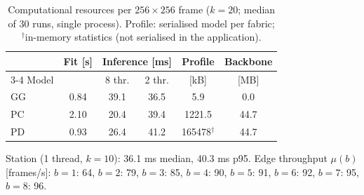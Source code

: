 \begin{table}[t]
\centering
\caption{Computational resources per $256\times256$ frame ($k=20$; median of 30 runs, single process). Profile: serialised model per fabric; $^\dagger$in-memory statistics (not serialised in the application).}
\label{tab:resources}
\footnotesize
\setlength{\tabcolsep}{4pt}
\begin{tabular}{@{}lccccc@{}}
\toprule
& Fit [s] & \multicolumn{2}{c}{Inference [ms]} & Profile & Backbone \\
\cmidrule(lr){3-4}
Model & & 8 thr. & 2 thr. & [kB] & [MB] \\
\midrule
GG & 0.84 & 39.1 & 36.5 & 5.9 & 0.0 \\
PC & 2.10 & 20.4 & 39.4 & 1221.5 & 44.7 \\
PD & 0.93 & 26.4 & 41.2 & 165478$^\dagger$ & 44.7 \\
\bottomrule
\end{tabular}

\vspace{2pt}
\begin{flushleft}\footnotesize
Station (1 thread, $k=10$): 36.1 ms median, 40.3 ms p95. Edge throughput $\mu(b)$ [frames/s]: $b{=}1$: 64, $b{=}2$: 79, $b{=}3$: 85, $b{=}4$: 90, $b{=}5$: 91, $b{=}6$: 92, $b{=}7$: 95, $b{=}8$: 96.
\end{flushleft}
\end{table}

